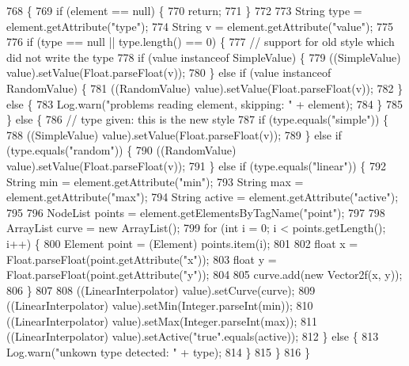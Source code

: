 \begin{DoxyCode}
768                                              \{
769         \textcolor{keywordflow}{if} (element == null) \{
770             \textcolor{keywordflow}{return};
771         \}
772 
773         String type = element.getAttribute(\textcolor{stringliteral}{"type"});
774         String v = element.getAttribute(\textcolor{stringliteral}{"value"});
775 
776         \textcolor{keywordflow}{if} (type == null || type.length() == 0) \{
777             \textcolor{comment}{// support for old style which did not write the type}
778             \textcolor{keywordflow}{if} (value instanceof SimpleValue) \{
779                 ((SimpleValue) value).setValue(Float.parseFloat(v));
780             \} \textcolor{keywordflow}{else} \textcolor{keywordflow}{if} (value instanceof RandomValue) \{
781                 ((RandomValue) value).setValue(Float.parseFloat(v));
782             \} \textcolor{keywordflow}{else} \{
783                 Log.warn(\textcolor{stringliteral}{"problems reading element, skipping: "} + element);
784             \}
785         \} \textcolor{keywordflow}{else} \{
786             \textcolor{comment}{// type given: this is the new style}
787             \textcolor{keywordflow}{if} (type.equals(\textcolor{stringliteral}{"simple"})) \{
788                 ((SimpleValue) value).setValue(Float.parseFloat(v));
789             \} \textcolor{keywordflow}{else} \textcolor{keywordflow}{if} (type.equals(\textcolor{stringliteral}{"random"})) \{
790                 ((RandomValue) value).setValue(Float.parseFloat(v));
791             \} \textcolor{keywordflow}{else} \textcolor{keywordflow}{if} (type.equals(\textcolor{stringliteral}{"linear"})) \{
792                 String min = element.getAttribute(\textcolor{stringliteral}{"min"});
793                 String max = element.getAttribute(\textcolor{stringliteral}{"max"});
794                 String active = element.getAttribute(\textcolor{stringliteral}{"active"});
795 
796                 NodeList points = element.getElementsByTagName(\textcolor{stringliteral}{"point"});
797 
798                 ArrayList curve = \textcolor{keyword}{new} ArrayList();
799                 \textcolor{keywordflow}{for} (\textcolor{keywordtype}{int} i = 0; i < points.getLength(); i++) \{
800                     Element point = (Element) points.item(i);
801 
802                     \textcolor{keywordtype}{float} x = Float.parseFloat(point.getAttribute(\textcolor{stringliteral}{"x"}));
803                     \textcolor{keywordtype}{float} y = Float.parseFloat(point.getAttribute(\textcolor{stringliteral}{"y"}));
804 
805                     curve.add(\textcolor{keyword}{new} Vector2f(x, y));
806                 \}
807 
808                 ((LinearInterpolator) value).setCurve(curve);
809                 ((LinearInterpolator) value).setMin(Integer.parseInt(min));
810                 ((LinearInterpolator) value).setMax(Integer.parseInt(max));
811                 ((LinearInterpolator) value).setActive(\textcolor{stringliteral}{"true"}.equals(active));
812             \} \textcolor{keywordflow}{else} \{
813                 Log.warn(\textcolor{stringliteral}{"unkown type detected: "} + type);
814             \}
815         \}
816     \}
\end{DoxyCode}
